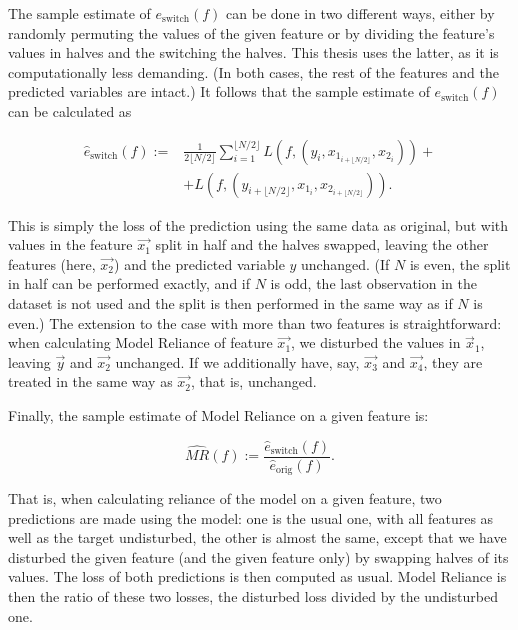 			The sample estimate of $e_{\text{switch}}(f)$ can be done in two different ways, either by randomly permuting the values of the given feature or by dividing the feature's values in halves and the switching the halves. This thesis uses the latter, as it is computationally less demanding. (In both cases, the rest of the features and the predicted variables are intact.) It follows that the sample estimate of $e_{\text{switch}}(f)$ can be calculated as
			
			
			\begin{equation*}
				\begin{split}
					\hat{e}_{\text{switch}}(f):= & \frac{1}{2 \lfloor N/2 \rfloor} \sum_{i=1}^{\lfloor N/2 \rfloor} L \left(f, \left( y_i, x_{1_{i+\lfloor N/2 \rfloor}}, x_{2_{i}} \right) \right) + \\ 
					& + L \left( f, \left(y_{i+\lfloor N/2 \rfloor}, x_{1_{i}}, x_{2_{i+\lfloor N/2 \rfloor}} \right) \right). 
				\end{split}
			\end{equation*}
			
			This is simply the loss of the prediction using the same data as original, but with values in the feature $\vec{x_1}$ split in half and the halves swapped, leaving the other features (here, $\vec{x_2}$) and the predicted variable $y$ unchanged. (If $N$ is even, the split in half can be performed exactly, and if $N$ is odd, the last observation in the dataset is not used and the split is then performed in the same way as if $N$ is even.) The extension to the case with more than two features is straightforward: when calculating Model Reliance of feature $\vec{x_1}$, we disturbed the values in $\vec{x}_1$, leaving $\vec{y}$ and $\vec{x_2}$ unchanged. If we additionally have, say, $\vec{x_3}$ and $\vec{x_4}$, they are treated in the same way as $\vec{x_2}$, that is, unchanged. 
			
			Finally, the sample estimate of Model Reliance on a given feature is: 
			
			\begin{equation*}
				\widehat{MR}(f):=\frac{\hat{e}_{\text{switch}}(f)}{\hat{e}_{\text{orig}}(f)}.
			\end{equation*}
				
			That is, when calculating reliance of the model on a given feature, two predictions are made using the model: one is the usual one, with all features as well as the target undisturbed, the other is almost the same, except that we have disturbed the given feature (and the given feature only) by swapping halves of its values. The loss of both predictions is then computed as usual. Model Reliance is then the ratio of these two losses, the disturbed loss divided by the undisturbed one.   
			
